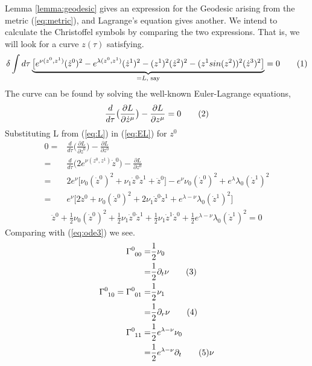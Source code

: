 \documentclass[]{article}
\newcommand\numberthis{\addtocounter{equation}{1}\tag{\theequation}}
\begin{document}
Lemma \ref{lemma:geodesic} gives an expression for the Geodesic arising from the metric (\ref{eq:metric}), and Lagrange's equation gives another. We intend to calculate the Christoffel symbols by comparing the two expressions. That is, we will look for a curve $z(\tau)$ satisfying.
\begin{align*}
\delta \int d\tau \underbrace{\big[e^{\nu(z^0,z^1)} (\dot z^0)^2 - e^{\lambda(z^0,z^1)} (\dot z^1) ^ 2 -(z^1)^2 (\dot z^2)^2 - (z^1 sin(z^2))^2  (\dot z^3)^2\big]}_{=L\text{, say}}=0 \numberthis \label{eq:L}
\end{align*}
The curve can be found by solving the well-known Euler-Lagrange equations, \cite{wiki_lagrange}
\begin{align*}
\frac{d}{d\tau}\big(\frac{\partial L}{\partial \dot z^\mu}\big)-\frac{\partial L}{\partial z^\mu}=0 \numberthis \label{eq:EL}
\end{align*}
Substituting L from (\ref{eq:L}) in (\ref{eq:EL}) for $z^0$
\begin{align*}
0=&\frac{d}{d\tau}\big(\frac{\partial L}{\partial \dot z^0}\big)-\frac{\partial L}{\partial z^0}\\
= & \frac{d}{d\tau}\big(2 e^{\nu(z^0,z^1)}\dot z^0\big) - \frac{\partial L}{\partial z^0}\\
=& 2 e^\nu \big[\nu_0 (\dot z^0)^2 + \nu_1 \dot z^0 \dot z^1 +\ddot z^0\big]- e^{\nu}\nu_{0} (\dot z^0)^2 + e^{\lambda} \lambda_0 (\dot z^1)^2\\
=& e^\nu \big[2\ddot z^0+ \nu_0 (\dot z^0)^2 + 2\nu_1 \dot z^0 \dot z^1 + e^{\lambda-\nu} \lambda_0 (\dot z^1)^2\big]
\end{align*}
\begin{align*}
\ddot z^0+ \frac{1}{2}\nu_0 (\dot z^0)^2 + \frac{1}{2} \nu_1 \dot z^0 \dot z^1 + \frac{1}{2} \nu_1 \dot z^1 \dot z^0+ \frac{1}{2} e^{\lambda-\nu} \lambda_0 (\dot z^1)^2=0
\end{align*}
Comparing with (\ref{eq:ode3}) we see.
\begin{align*}
\Gamma\indices{^0_0_0} =& \frac{1}{2}\nu_0\\
=& \frac{1}{2}\partial_t \nu \numberthis \label{eq:C000}\\
\Gamma\indices{^0_1_0} =\Gamma\indices{^0_0_1} =& \frac{1}{2}\nu_1\\
=& \frac{1}{2} \partial_r \nu \numberthis \label{eq:C010}\\
\Gamma\indices{^0_1_1} =& \frac{1}{2}e^{\lambda-\nu}\nu_0\\
=& \frac{1}{2}e^{\lambda-\nu}\partial_t \numberthis \label{eq:C011} \nu
\end{align*}
\end{document}
